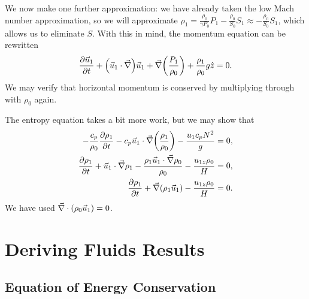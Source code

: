 \documentclass[11pt,
        usenames, %
        dvipsnames %
    ]{report}
\newcommand*{\pd}[2]{\frac{\partial#1}{\partial#2}}
\DeclarePairedDelimiter\p{\lparen}{\rparen}
\begin{document}
We now make one further approximation: we have already taken the low Mach number
approximation, so we will approximate $\rho_1 = \frac{\rho_0}{\gamma P_0}P_1 -
\frac{\rho_0}{S_0}S_1 \approx -\frac{\rho_0}{S_0}S_1$, which allows us to
eliminate $S$. With this in mind, the momentum equation can be rewritten
\begin{equation}
    \pd{\vec{u}_1}{t} + \p*{\vec{u}_1 \cdot \vec{\nabla}}\vec{u}_1
        + \vec{\nabla}\p*{\frac{P_1}{\rho_0}}
        + \frac{\rho_1}{\rho_0}g\hat{z} = 0.
\end{equation}
We may verify that horizontal momentum is conserved by multiplying through with
$\rho_0$ again.

The entropy equation takes a bit more work, but we may show that
\begin{align}
    -\frac{c_p}{\rho_0}\pd{\rho_1}{t} - c_p \vec{u}_1 \cdot
        \vec{\nabla}\p*{\frac{\rho_1}{\rho_0}} - \frac{u_1 c_p N^2}{g} &= 0,\\
    \pd{\rho_1}{t} + \vec{u}_1 \cdot \vec{\nabla}\rho_1
        - \frac{\rho_1\vec{u}_1 \cdot \vec{\nabla}\rho_0}{\rho_0}
        - \frac{u_{1z}\rho_0}{H} &= 0,\nonumber\\
    \pd{\rho_1}{t} + \vec{\nabla}\p*{\rho_1 \vec{u}_1} - \frac{u_{1z}\rho_0}{H}
        &= 0.
\end{align}
We have used $\vec{\nabla} \cdot \p*{\rho_0 \vec{u}_1} = 0$.

\clearpage

\appendix

\chapter{Deriving Fluids Results}

\section{Equation of Energy Conservation}
\end{document}
